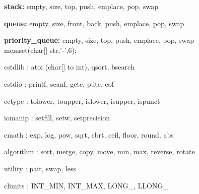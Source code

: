 \documentclass[table]{article}
\begin{document}
\textbf{stack:} empty, size, top, push, emplace, pop, swap

\textbf{queue:} empty, size, front, back, push, emplace, pop, swap

\textbf{priority\_queue:} empty, size, top, push, emplace, pop, swap\\

memset(char[] str,'-',6);

cstdlib : atoi (char[] to int), qsort, bsearch

cstdio : printf, scanf, getc, putc, eof

cctype : tolower, toupper, islower, isupper, ispunct

iomanip : setfill, setw, setprecision

cmath : exp, log, pow, sqrt, cbrt, ceil, floor, round, abs

algorithm : sort, merge, copy, move, min, max, reverse, rotate

utility : pair, swap, less

climits : INT\_MIN, INT\_MAX, LONG\_, LLONG\_
	
\end{document}

